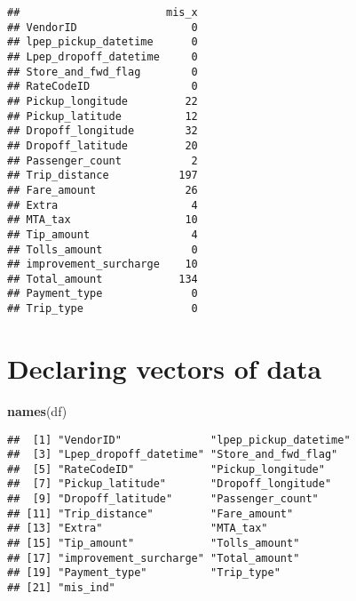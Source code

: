 \documentclass[]{article}
\newenvironment{Shaded}{\begin{snugshade}}{\end{snugshade}}
\newcommand{\KeywordTok}[1]{\textcolor[rgb]{0.13,0.29,0.53}{\textbf{{#1}}}}
\newcommand{\StringTok}[1]{\textcolor[rgb]{0.31,0.60,0.02}{{#1}}}
\newcommand{\CommentTok}[1]{\textcolor[rgb]{0.56,0.35,0.01}{\textit{{#1}}}}
\newcommand{\NormalTok}[1]{{#1}}
\begin{document}
\begin{Shaded}
\end{Shaded}

\begin{verbatim}
##                       mis_x
## VendorID                  0
## lpep_pickup_datetime      0
## Lpep_dropoff_datetime     0
## Store_and_fwd_flag        0
## RateCodeID                0
## Pickup_longitude         22
## Pickup_latitude          12
## Dropoff_longitude        32
## Dropoff_latitude         20
## Passenger_count           2
## Trip_distance           197
## Fare_amount              26
## Extra                     4
## MTA_tax                  10
## Tip_amount                4
## Tolls_amount              0
## improvement_surcharge    10
## Total_amount            134
## Payment_type              0
## Trip_type                 0
\end{verbatim}

\section{Declaring vectors of data}\label{declaring-vectors-of-data}

\begin{Shaded}
\begin{Highlighting}[]
\KeywordTok{names}\NormalTok{(df)}
\end{Highlighting}
\end{Shaded}

\begin{verbatim}
##  [1] "VendorID"              "lpep_pickup_datetime" 
##  [3] "Lpep_dropoff_datetime" "Store_and_fwd_flag"   
##  [5] "RateCodeID"            "Pickup_longitude"     
##  [7] "Pickup_latitude"       "Dropoff_longitude"    
##  [9] "Dropoff_latitude"      "Passenger_count"      
## [11] "Trip_distance"         "Fare_amount"          
## [13] "Extra"                 "MTA_tax"              
## [15] "Tip_amount"            "Tolls_amount"         
## [17] "improvement_surcharge" "Total_amount"         
## [19] "Payment_type"          "Trip_type"            
## [21] "mis_ind"
\end{verbatim}
\end{document}
